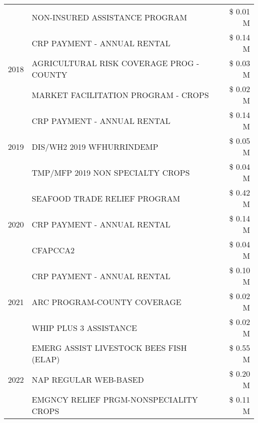 \begin{tabular}{llr}
 & NON-INSURED ASSISTANCE PROGRAM & \$ 0.01 M \\
\cline{1-3}
\multirow[t]{3}{*}{2018} & CRP PAYMENT - ANNUAL RENTAL & \$ 0.14 M \\
 & AGRICULTURAL RISK COVERAGE PROG - COUNTY & \$ 0.03 M \\
 & MARKET FACILITATION PROGRAM - CROPS & \$ 0.02 M \\
\cline{1-3}
\multirow[t]{3}{*}{2019} & CRP PAYMENT - ANNUAL RENTAL & \$ 0.14 M \\
 & DIS/WH2 2019 WFHURRINDEMP & \$ 0.05 M \\
 & TMP/MFP 2019 NON SPECIALTY CROPS & \$ 0.04 M \\
\cline{1-3}
\multirow[t]{3}{*}{2020} & SEAFOOD TRADE RELIEF PROGRAM & \$ 0.42 M \\
 & CRP PAYMENT - ANNUAL RENTAL & \$ 0.14 M \\
 & CFAPCCA2 & \$ 0.04 M \\
\cline{1-3}
\multirow[t]{3}{*}{2021} & CRP PAYMENT - ANNUAL RENTAL & \$ 0.10 M \\
 & ARC PROGRAM-COUNTY COVERAGE & \$ 0.02 M \\
 & WHIP PLUS 3 ASSISTANCE & \$ 0.02 M \\
\cline{1-3}
\multirow[t]{3}{*}{2022} & EMERG ASSIST LIVESTOCK BEES FISH (ELAP) & \$ 0.55 M \\
 & NAP REGULAR WEB-BASED & \$ 0.20 M \\
 & EMGNCY RELIEF PRGM-NONSPECIALITY CROPS & \$ 0.11 M \\
\cline{1-3}
\bottomrule
\end{tabular}
